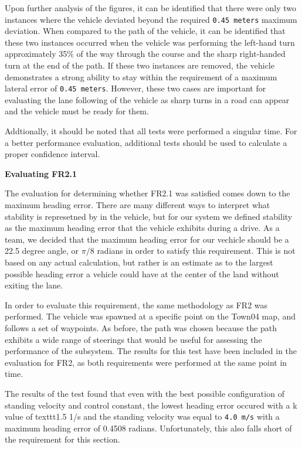 \documentclass[titlepage,draft]{article}
\begin{document}
{Upon further analysis of the figures, it can be identified that there were only two instances where the vehicle deviated beyond the required \texttt{0.45 meters} maximum deviation. When compared to the path of the vehicle, it can be identified that these two instances occurred when the vehicle was performing the left-hand turn approximately 35\% of the way through the course and the sharp right-handed turn at the end of the path. If these two instances are removed, the vehicle demonstrates a strong ability to stay within the requirement of a maximum lateral error of \texttt{0.45 meters}. However, these two cases are important for evaluating the lane following of the vehicle as sharp turns in a road can appear and the vehicle must be ready for them.

Addtionally, it should be noted that all tests were performed a singular time. For a better performance evaluation, additional tests should be used to calculate a proper confidence interval.

\textbf{Evaluating FR2.1}

The evaluation for determining whether FR2.1 was satisfied comes down to the maximum heading error. There are many different ways to interpret what stability is represetned by in the vehicle, but for our system we defined stability as the maximum heading error that the vehicle exhibits during a drive. As a team, we decided that the maximum heading error for our vechicle should be a 22.5 degree angle, or \(\pi/8\) radians in order to satisfy this requirement. This is not based on any actual calculation, but rather is an estimate as to the largest possible heading error a vehicle could have at the center of the land without exiting the lane.

In order to evaluate this requirement, the same methodology as FR2 was performed. The vehicle was spawned at a specific point on the Town04 map, and follows a set of waypoints. As before, the path was chosen because the path exhibits a wide range of steerings that would be useful for assessing the performance of the subsystem. The results for this test have been included in the evaluation for FR2, as both requirements were performed at the same point in time.

The results of the test found that even with the best possible configuration of standing velocity and control constant, the lowest heading error occured with a k value of texttt{1.5 1/s} and the standing velocity was equal to \texttt{4.0 m/s} with a maximum heading error of 0.4508 radians. Unfortunately, this also falls short of the requirement for this section.

}
\end{document}
